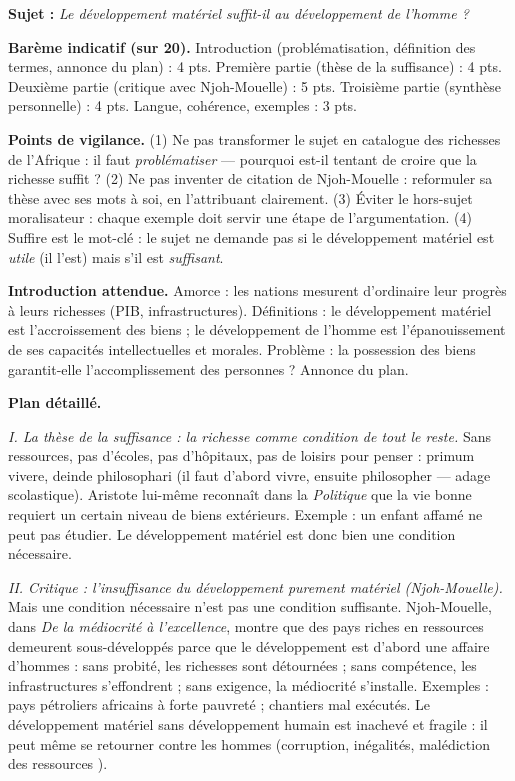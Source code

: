 \documentclass[11pt]{article}
\begin{document}
\begin{corrige}

\textbf{Sujet :} \emph{Le développement matériel suffit-il au développement de l'homme ?}

\tcblower

\textbf{Barème indicatif (sur 20).} Introduction (problématisation, définition des termes, annonce du plan) : 4 pts. Première partie (thèse de la suffisance) : 4 pts. Deuxième partie (critique avec Njoh-Mouelle) : 5 pts. Troisième partie (synthèse personnelle) : 4 pts. Langue, cohérence, exemples : 3 pts.

\textbf{Points de vigilance.} (1) Ne pas transformer le sujet en catalogue des richesses de l'Afrique : il faut \emph{problématiser} — pourquoi est-il tentant de croire que la richesse suffit ? (2) Ne pas inventer de citation de Njoh-Mouelle : reformuler sa thèse avec ses mots à soi, en l'attribuant clairement. (3) Éviter le hors-sujet moralisateur : chaque exemple doit servir une étape de l'argumentation. (4) \guillemotleft Suffire \guillemotright est le mot-clé : le sujet ne demande pas si le développement matériel est \emph{utile} (il l'est) mais s'il est \emph{suffisant}.

\textbf{Introduction attendue.} Amorce : les nations mesurent d'ordinaire leur progrès à leurs richesses (PIB, infrastructures). Définitions : le développement matériel est l'accroissement des biens ; le développement de l'homme est l'épanouissement de ses capacités intellectuelles et morales. Problème : la possession des biens garantit-elle l'accomplissement des personnes ? Annonce du plan.

\textbf{Plan détaillé.}

\emph{I. La thèse de la suffisance : la richesse comme condition de tout le reste.} Sans ressources, pas d'écoles, pas d'hôpitaux, pas de loisirs pour penser : \guillemotleft primum vivere, deinde philosophari \guillemotright (il faut d'abord vivre, ensuite philosopher — adage scolastique). Aristote lui-même reconnaît dans la \emph{Politique} que la vie bonne requiert un certain niveau de biens extérieurs. Exemple : un enfant affamé ne peut pas étudier. Le développement matériel est donc bien une condition nécessaire.

\emph{II. Critique : l'insuffisance du développement purement matériel (Njoh-Mouelle).} Mais une condition nécessaire n'est pas une condition suffisante. Njoh-Mouelle, dans \emph{De la médiocrité à l'excellence}, montre que des pays riches en ressources demeurent sous-développés parce que le développement est \guillemotleft d'abord une affaire d'hommes \guillemotright : sans probité, les richesses sont détournées ; sans compétence, les infrastructures s'effondrent ; sans exigence, la médiocrité s'installe. Exemples : pays pétroliers africains à forte pauvreté ; chantiers mal exécutés. Le développement matériel sans développement humain est inachevé et fragile : il peut même se retourner contre les hommes (corruption, inégalités, \guillemotleft malédiction des ressources \guillemotright).


\end{corrige}
\end{document}
